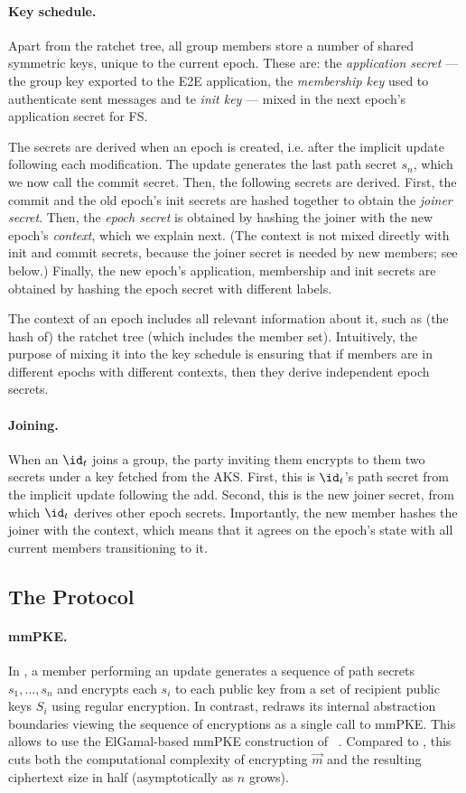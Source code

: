 \paragraph{Key schedule.}
Apart from the ratchet tree, all group members store a number of shared symmetric keys, unique to the current epoch. These are: the \emph{application secret} --- the group key exported to the E2E application, the \emph{membership key} used to authenticate sent messages and te \emph{init key} --- mixed in the next epoch's application secret for FS.

The secrets are derived when an epoch is created, i.e. after the implicit update following each modification. The update generates the last path secret $s_n$, which we now call the commit secret. Then, the following secrets are derived. First, the commit and the old epoch's init secrets are hashed together to obtain the \emph{joiner secret}. Then, the \emph{epoch secret} is obtained by hashing the joiner with the new epoch's \emph{context}, which we explain next. (The context is not mixed directly with init and commit secrets, because the joiner secret is needed by new members; see below.) Finally, the new epoch's application, membership and init secrets are obtained by hashing the epoch secret with different labels.

The context of an epoch includes all relevant information about it, such as (the hash of) the ratchet tree (which includes the member set). Intuitively, the purpose of mixing it into the key schedule is ensuring that if members are in different epochs with different contexts, then they derive independent epoch secrets.

\paragraph{Joining.}
When an $\id_t$ joins a group, the party inviting them encrypts to them two secrets under a key fetched from the AKS. First, this is $\id_t$'s path secret from the implicit update following the add. Second, this is the new joiner secret, from which $\id_t$ derives other epoch secrets.
Importantly, the new member hashes the joiner with the context, which means that it agrees on the epoch's state with all current members transitioning to it.

\subsection{The \saik Protocol}\label{sec:intuition2}
\paragraph{mmPKE.}
In \protITK, a member performing an update generates a sequence of path secrets $s_1, \dots, s_n$ and encrypts each $s_i$ to each public key from a set of recipient public keys $S_i$ using regular encryption.
In contrast, \saik redraws its internal abstraction boundaries viewing the sequence of encryptions as a single call to mmPKE.
This allows \saik to use the ElGamal-based mmPKE construction of
~\cite{ASIACCS:PinPoeSch14}. Compared to \protITK, this cuts both the
computational complexity of encrypting $\vec m$ and the resulting ciphertext
size in half (asymptotically as $n$ grows).

